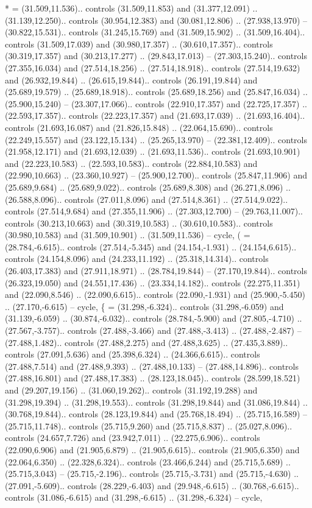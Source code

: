 {*} = {(31.509,11.536).. controls (31.509,11.853) and (31.377,12.091) .. (31.139,12.250).. controls (30.954,12.383) and (30.081,12.806) .. (27.938,13.970) -- (30.822,15.531).. controls (31.245,15.769) and (31.509,15.902) .. (31.509,16.404).. controls (31.509,17.039) and (30.980,17.357) .. (30.610,17.357).. controls (30.319,17.357) and (30.213,17.277) .. (29.843,17.013) -- (27.303,15.240).. controls (27.355,16.034) and (27.514,18.256) .. (27.514,18.918).. controls (27.514,19.632) and (26.932,19.844) .. (26.615,19.844).. controls (26.191,19.844) and (25.689,19.579) .. (25.689,18.918).. controls (25.689,18.256) and (25.847,16.034) .. (25.900,15.240) -- (23.307,17.066).. controls (22.910,17.357) and (22.725,17.357) .. (22.593,17.357).. controls (22.223,17.357) and (21.693,17.039) .. (21.693,16.404).. controls (21.693,16.087) and (21.826,15.848) .. (22.064,15.690).. controls (22.249,15.557) and (23.122,15.134) .. (25.265,13.970) -- (22.381,12.409).. controls (21.958,12.171) and (21.693,12.039) .. (21.693,11.536).. controls (21.693,10.901) and (22.223,10.583) .. (22.593,10.583).. controls (22.884,10.583) and (22.990,10.663) .. (23.360,10.927) -- (25.900,12.700).. controls (25.847,11.906) and (25.689,9.684) .. (25.689,9.022).. controls (25.689,8.308) and (26.271,8.096) .. (26.588,8.096).. controls (27.011,8.096) and (27.514,8.361) .. (27.514,9.022).. controls (27.514,9.684) and (27.355,11.906) .. (27.303,12.700) -- (29.763,11.007).. controls (30.213,10.663) and (30.319,10.583) .. (30.610,10.583).. controls (30.980,10.583) and (31.509,10.901) .. (31.509,11.536) -- cycle},
{(} = {(28.784,-6.615).. controls (27.514,-5.345) and (24.154,-1.931) .. (24.154,6.615).. controls (24.154,8.096) and (24.233,11.192) .. (25.318,14.314).. controls (26.403,17.383) and (27.911,18.971) .. (28.784,19.844) -- (27.170,19.844).. controls (26.323,19.050) and (24.551,17.436) .. (23.334,14.182).. controls (22.275,11.351) and (22.090,8.546) .. (22.090,6.615).. controls (22.090,-1.931) and (25.900,-5.450) .. (27.170,-6.615) -- cycle},
{\{} = {(31.298,-6.324).. controls (31.298,-6.059) and (31.139,-6.059) .. (30.874,-6.032).. controls (28.784,-5.900) and (27.805,-4.710) .. (27.567,-3.757).. controls (27.488,-3.466) and (27.488,-3.413) .. (27.488,-2.487) -- (27.488,1.482).. controls (27.488,2.275) and (27.488,3.625) .. (27.435,3.889).. controls (27.091,5.636) and (25.398,6.324) .. (24.366,6.615).. controls (27.488,7.514) and (27.488,9.393) .. (27.488,10.133) -- (27.488,14.896).. controls (27.488,16.801) and (27.488,17.383) .. (28.123,18.045).. controls (28.599,18.521) and (29.207,19.156) .. (31.060,19.262).. controls (31.192,19.288) and (31.298,19.394) .. (31.298,19.553).. controls (31.298,19.844) and (31.086,19.844) .. (30.768,19.844).. controls (28.123,19.844) and (25.768,18.494) .. (25.715,16.589) -- (25.715,11.748).. controls (25.715,9.260) and (25.715,8.837) .. (25.027,8.096).. controls (24.657,7.726) and (23.942,7.011) .. (22.275,6.906).. controls (22.090,6.906) and (21.905,6.879) .. (21.905,6.615).. controls (21.905,6.350) and (22.064,6.350) .. (22.328,6.324).. controls (23.466,6.244) and (25.715,5.689) .. (25.715,3.043) -- (25.715,-2.196).. controls (25.715,-3.731) and (25.715,-4.630) .. (27.091,-5.609).. controls (28.229,-6.403) and (29.948,-6.615) .. (30.768,-6.615).. controls (31.086,-6.615) and (31.298,-6.615) .. (31.298,-6.324) -- cycle},
